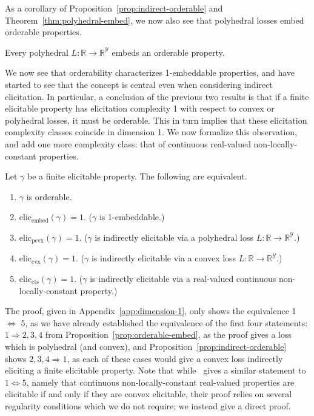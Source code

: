\documentclass[anon]{colt2020} %
\newcommand{\reals}{\mathbb{R}}
\newcommand{\eliccts}{\mathrm{elic}_\mathrm{cts}}
\newcommand{\eliccvx}{\mathrm{elic}_\mathrm{cvx}}
\newcommand{\elicpoly}{\mathrm{elic}_\mathrm{pcvx}}
\newcommand{\elicembed}{\mathrm{elic}_\mathrm{embed}}
\newcommand{\Y}{\mathcal{Y}}
\begin{document}
As a corollary of Proposition~\ref{prop:indirect-orderable} and Theorem~\ref{thm:polyhedral-embed}, we now also see that polyhedral losses embed orderable properties.

\begin{corollary}\label{cor:embed-orderable}
	Every polyhedral $L : \reals \to \reals^\Y$ embeds an orderable property.
\end{corollary}

We now see that orderability characterizes 1-embeddable properties, and have started to see that the concept is central even when considering indirect elicitation.
In particular, a conclusion of the previous two results is that if a finite elicitable property has elicitation complexity 1 with respect to convex or polyhedral losses, it must be orderable.
This in turn implies that these elicitation complexity classes coincide in dimension 1.
We now formalize this observation, and add one more complexity class: that of continuous real-valued non-locally-constant properties.

\begin{theorem}\label{thm:1d-tfae}
	Let $\gamma$ be a finite elicitable property.
	The following are equivalent.
	\begin{enumerate}\setlength{\itemsep}{0pt}
		\item $\gamma$ is orderable.
		\item $\elicembed(\gamma)=1$. ($\gamma$ is 1-embeddable.)
		\item $\elicpoly(\gamma)=1$. ($\gamma$ is indirectly elicitable via a polyhedral loss $L:\reals\to\reals^\Y$.)
		\item $\eliccvx(\gamma)=1$. ($\gamma$ is indirectly elicitable via a convex loss $L:\reals\to\reals^\Y$.)
		\item $\eliccts(\gamma)=1$. ($\gamma$ is indirectly elicitable via a real-valued continuous non-locally-constant property.)
	\end{enumerate}
\end{theorem}

The proof, given in Appendix~\ref{app:dimension-1}, only shows the equivalence 1 $\Leftrightarrow$ 5, as we have already established the equivalence of the first four statements: $1 \Rightarrow 2,3,4$ from Proposition~\ref{prop:orderable-embed}, as the proof gives a loss which is polyhedral (and convex), and Proposition~\ref{prop:indirect-orderable} shows $2,3,4 \Rightarrow 1$, as each of these cases would give a convex loss indirectly eliciting a finite elicitable property.
Note that while~\citet{finocchiaro2018convex} gives a similar statement to $1\Leftrightarrow 5$, namely that continuous non-locally-constant real-valued properties are elicitable if and only if they are convex elicitable, their proof relies on several regularity conditions which we do not require; we instead give a direct proof.
\end{document}
